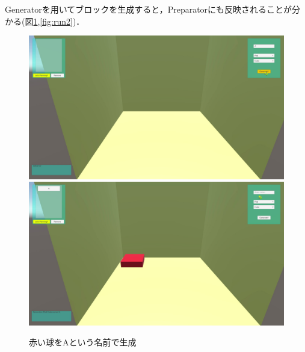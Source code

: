 \documentclass[12pt]{jarticle}
\begin{document}
Generatorを用いてブロックを生成すると，Preparatorにも反映されることが分かる(図\ref{fig:run1},\ref{fig:run2})．

\begin{figure}[!hbt]
  	\begin{center}
  		\includegraphics[scale=0.2]{images/BWP_Work6/bwp1.jpg}
  		\includegraphics[scale=0.2]{images/BWP_Work6/bwp2.jpg}
	\end{center}
  	\caption{赤い球をAという名前で生成}
  	\label{fig:run1}
\end{figure}
\end{document}
